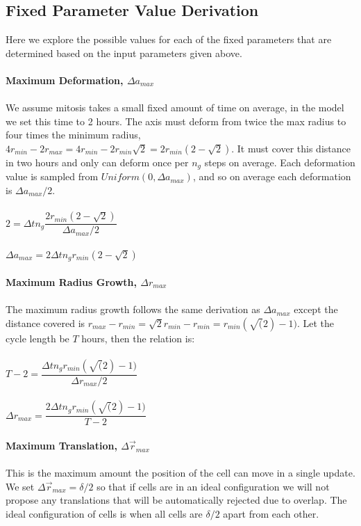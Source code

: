 \documentclass{article}
\begin{document}
\subsection{Fixed Parameter Value Derivation}
Here we explore the possible values for each of the fixed parameters that are determined based on the input parameters given above.\\
\\
\textbf{Maximum Deformation, $\Delta a_{max}$}\\
\\
We assume mitosis takes a small fixed amount of time on average, in the model we set this time to 2 hours. The axis must deform from twice the max radius to four times the minimum radius, $4r_{min} - 2r_{max} = 4r_{min} - 2r_{min}\sqrt{2} = 2r_{min}(2 - \sqrt{2})$. It must cover this distance in two hours and only can deform once per $n_g$ steps on average. Each deformation value is sampled from $Uniform(0, \Delta a_{max})$, and so on average each deformation is $\Delta a_{max} / 2$.\\
\\
$2 = \Delta t n_g \dfrac{2r_{min}(2 - \sqrt{2})}{\Delta a_{max} / 2}$\\
\\
$\Delta a_{max} = 2\Delta t n_g r_{min}(2 - \sqrt{2})$\\
\\
\textbf{Maximum Radius Growth, $\Delta r_{max}$}\\
\\
The maximum radius growth follows the same derivation as $\Delta a_{max}$ except the distance covered is $r_{max} - r_{min} = \sqrt{2}r_{min} - r_{min} = r_{min}(\sqrt(2) - 1)$. Let the cycle length be $T$ hours, then the relation is:\\
\\
$T - 2 = \dfrac{\Delta t n_g r_{min}(\sqrt(2) - 1)}{\Delta r_{max} / 2}$\\
\\
$\Delta r_{max} = \dfrac{2\Delta t n_g r_{min}(\sqrt(2) - 1)}{T - 2}$\\
\\
\textbf{Maximum Translation, $\Delta \vec{r}_{max}$}\\
\\
This is the maximum amount the position of the cell can move in a single update. We set $\Delta \vec{r}_{max} = \delta / 2$ so that if cells are in an ideal configuration we will not propose any translations that will be automatically rejected due to overlap. The ideal configuration of cells is when all cells are $\delta / 2$ apart from each other.\\
\end{document}
